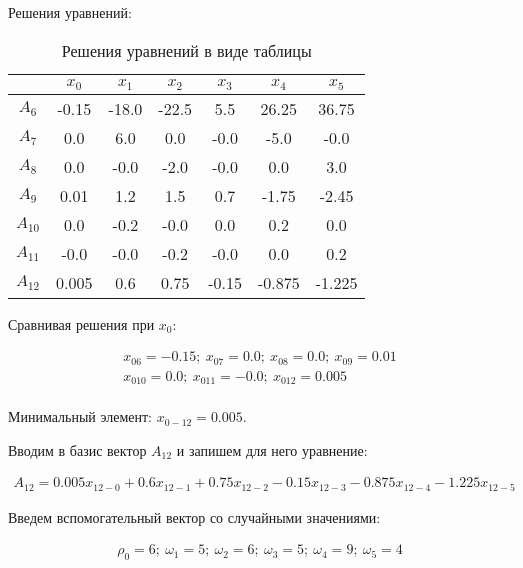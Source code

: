 \normalsize

Решения уравнений:

\begin{table}[H]
	\centering
	\normalsize
	\caption{Решения уравнений в виде таблицы}
	\label{tbl:1}
	\begin{tabular}{|c|c|c|c|c|c|c|}
		\hline
		&$x_{0}$&$x_{1}$&$x_{2}$&$x_{3}$&$x_{4}$&$x_{5}$\\ \hline
		$A_{6}$&-0.15&-18.0&-22.5&5.5&26.25&36.75\\ \hline
		$A_{7}$&0.0&6.0&0.0&-0.0&-5.0&-0.0\\ \hline
		$A_{8}$&0.0&-0.0&-2.0&-0.0&0.0&3.0\\ \hline
		$A_{9}$&0.01&1.2&1.5&0.7&-1.75&-2.45\\ \hline
		$A_{10}$&0.0&-0.2&-0.0&0.0&0.2&0.0\\ \hline
		$A_{11}$&-0.0&-0.0&-0.2&-0.0&0.0&0.2\\ \hline
		$A_{12}$&0.005&0.6&0.75&-0.15&-0.875&-1.225\\ \hline

\end{tabular}

\end{table}

Сравнивая решения при $x_0$:

\vspace{-\baselineskip}\begin{align*}
	x_{06} = -0.15;\ x_{07} = 0.0;\ x_{08} = 0.0;\ x_{09} = 0.01\\ 
	x_{010} = 0.0;\ x_{011} = -0.0;\ x_{012} = 0.005\\
\end{align*}

Минимальный элемент: $x_{0-12} = 0.005$.

Вводим в базис вектор $A_{12}$ и запишем для него уравнение:

\small

\vspace{-\baselineskip}\begin{align*}
A_{12} = 0.005x_{12-0}+0.6x_{12-1}+0.75x_{12-2}-0.15x_{12-3}-0.875x_{12-4}-1.225x_{12-5}
\end{align*}

\normalsize

Введем вспомогательный вектор со случайными значениями:

\vspace{-\baselineskip}\begin{align*}
\rho_{0} = 6;\ \omega_{1} = 5;\ \omega_{2} = 6;\ \omega_{3} = 5;\ \omega_{4} = 9;\ \omega_{5} = 4
\end{align*}

